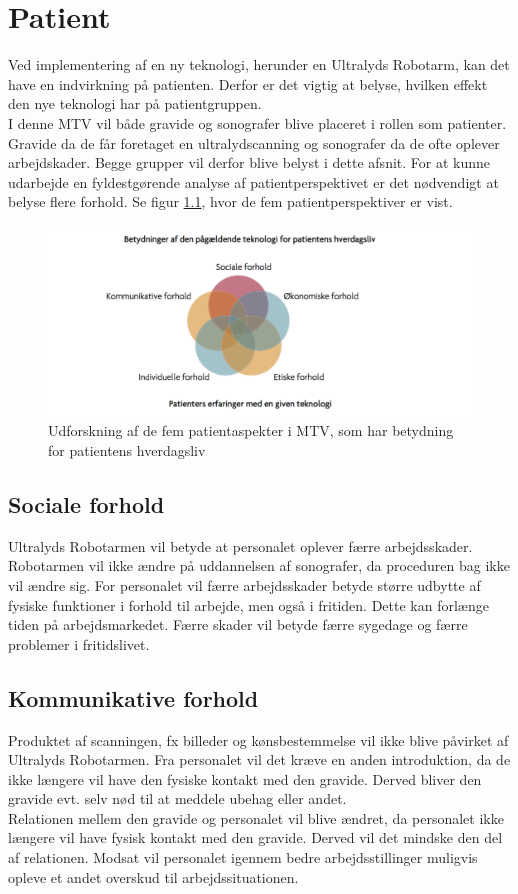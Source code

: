 \chapter{Patient}

Ved implementering af en ny teknologi, herunder en Ultralyds Robotarm, kan det have en indvirkning på patienten. Derfor er det vigtig at belyse, hvilken effekt den nye teknologi har på patientgruppen. \\
I denne MTV vil både gravide og sonografer blive placeret i rollen som patienter. Gravide da de får foretaget en ultralydscanning og sonografer da de ofte oplever arbejdskader. Begge grupper vil derfor blive belyst i dette afsnit.  
\newline
For at kunne udarbejde en fyldestgørende analyse af patientperspektivet er det nødvendigt at belyse flere forhold. Se figur \ref{patientMTV}, hvor de fem patientperspektiver er vist. 
\begin{figure}[h!]\centering
	\includegraphics[width = 1.0\textwidth]{Figurer/PatientaspekterMTV}
	\caption{Udforskning af de fem patientaspekter i MTV, som har betydning for patientens hverdagsliv}
	\label{patientMTV}
\end{figure}

\section{Sociale forhold}
Ultralyds Robotarmen vil betyde at personalet oplever færre arbejdsskader. Robotarmen vil ikke ændre på uddannelsen af sonografer, da proceduren bag ikke vil ændre sig. 
For personalet vil færre arbejdsskader betyde større udbytte af fysiske funktioner i forhold til arbejde, men også i fritiden. Dette kan forlænge tiden på arbejdsmarkedet. 
Færre skader vil betyde færre sygedage og færre problemer i fritidslivet. 

\section{Kommunikative forhold}
Produktet af scanningen, fx billeder og kønsbestemmelse vil ikke blive påvirket af Ultralyds Robotarmen.
Fra personalet vil det kræve en anden introduktion, da de ikke længere vil have den fysiske kontakt med den gravide. Derved bliver den gravide evt. selv nød til at meddele ubehag eller andet.  \\
Relationen mellem den gravide og personalet vil blive ændret, da personalet ikke længere vil have fysisk kontakt med den gravide. Derved vil det mindske den del af relationen. Modsat vil personalet igennem bedre arbejdsstillinger muligvis opleve et andet overskud til arbejdssituationen. 

